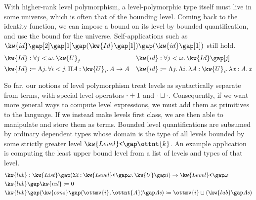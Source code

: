 \documentclass[a4paper,UKenglish,cleveref,autoref,thm-restate]{lipics-v2021}
\begin{document}
With higher-rank level polymorphism,
a level-polymorphic type itself must live in some universe,
which is often that of the bounding level.
Coming back to the identity function,
we can impose a bound on its level by bounded quantification,
and use the bound for the universe.
Self-applications such as $     \kw{ id }   \gap [   2   ]   \gap [   1   ]   \gap   (   \kw{ Id }   \gap [   1   ]  )    \gap   (   \kw{ id }   \gap [   1   ]  )  $ still hold.
%
\begin{align*}
   \kw{ Id }  &:  \forall  j  <   \omega   \mathpunct{.}   \kw{U}_{  \mathit{ j }  }   &
   \kw{ id }  &:   \forall  j  <   \omega   \mathpunct{.}   \kw{ Id }    \gap [   \mathit{ j }   ]  \\
   \kw{ Id }  &\coloneqq   \Lambda  j  \mathpunct{.}   \forall  i  <   \mathit{ j }   \mathpunct{.}   \Pi  A  \mathbin{:}   \kw{U}_{  \mathit{ i }  }   \mathpunct{.}   \mathit{ A }      \to   \mathit{ A }   &
   \kw{ id }  &\coloneqq  \Lambda  j  \mathpunct{.}   \Lambda  i  \mathpunct{.}   \lambda  A  \mathbin{:}   \kw{U}_{  \mathit{ i }  }   \mathpunct{.}   \lambda  x  \mathbin{:}   \mathit{ A }   \mathpunct{.}   \mathit{ x }     
\end{align*}

So far, our notions of level polymorphism treat levels as syntactically separate from terms,
with special level operators $\cdot   \relax   + 1 $ and $\cdot   \relax   \sqcup   \relax   \cdot$.
Consequently, if we want more general ways to compute level expressions,
we must add them as primitives to the language.
If we instead make levels first class,
we are then able to manipulate and store them as terms.
Bounded level quantifications are subsumed by ordinary dependent types
whose domain is the type of all levels bounded by some strictly greater level $ \kw{Level}\texttt{<} \gap  \ottnt{k} $.
An example application is computing the least upper bound level
from a list of levels and types of that level.
%
\begin{align*}
   \kw{ lub }  &:    \kw{ List }   \gap   (  \Sigma  i  \mathbin{:}   \kw{Level}\texttt{<} \gap   \omega    \mathpunct{.}   \kw{U} \gap   \mathit{ i }    )    \to   \kw{Level}\texttt{<} \gap   \omega    \\
   \kw{ lub }  &\gap  \kw{ nil }  \coloneqq 0 \\
   \kw{ lub }  &\gap  (    \kw{ cons }   \gap   (   \ottmv{i}   ,  \ottnt{A}  )    \gap   \mathit{ As }   )  \coloneqq   \ottmv{i}   \sqcup   (   \kw{ lub }   \gap   \mathit{ As }   )  
\end{align*}
\end{document}
